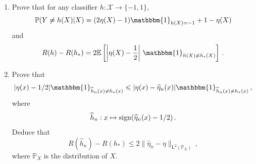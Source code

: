\documentclass[a4paper,10pt,fleqn]{article}
\newcommand{\eqsp}{\,}
\newcommand{\bP}{\mathbb{P}}
\newcommand{\xset}{\ensuremath{\mathsf{X}}}
\newcommand{\1}{\ensuremath{\mathbbm{1}}}
\newcommand{\bE}{\mathbb{E}}
\begin{document}
\begin{enumerate}
\item Prove that for any classifier $h:\mathcal{X}\to \{-1,1\}$,
$$
\bP(Y\neq h(X)|X) = (2\eta(X)-1)\1_{h(X)=-1}+1-\eta(X)
$$
and
$$
R(h)-R(h_{*})=2\bE \left[\left|\eta(X)-\frac{1}{2}\right|\eqsp\1_{h(X)\neq h_*(X)}\right]\eqsp.
$$
%
%
\item Prove that 
$$
|\eta(x)-1/2|\1_{\widehat h_n(x)\neq h_{*}(x)}\leqslant |\eta(x)-\widehat \eta_n(x)|\1_{\widehat h_n(x)\neq h_{*}(x)}\eqsp,
$$
where
$$
\widehat h_n:x \mapsto{\rm sign}(\widehat \eta_n(x)-1/2)\eqsp.
$$
Deduce that 
$$
R(\widehat h_n)-R(h_*)\leqslant 2\|\widehat \eta_n-\eta\|_{\mathrm{L}^2(\bP_X)}\eqsp,
$$
where $\bP_X$ is the distribution of $X$.
%

\end{enumerate}
\end{document}
